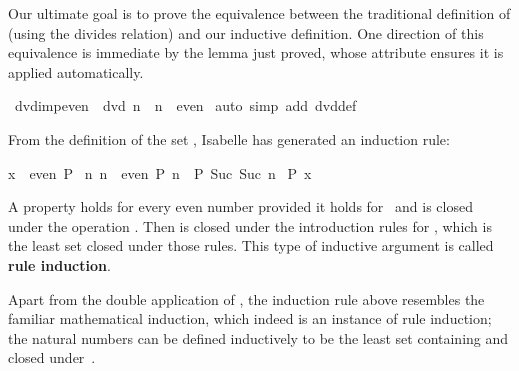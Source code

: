 \begin{isabellebody}
\begin{isamarkuptxt}
Our ultimate goal is to prove the equivalence between the traditional
definition of  (using the divides relation) and our inductive
definition.  One direction of this equivalence is immediate by the lemma
just proved, whose  attribute ensures it is applied automatically.%
\end{isamarkuptxt}%
\isamarkuptrue%
%
\endisatagproof
{\isafoldproof}%
%
\isadelimproof
%
\endisadelimproof
{}\isamarkupfalse%
\ dvd{\isacharunderscore}imp{\isacharunderscore}even{\isacharcolon}\ {\isachardoublequoteopen}{}\ dvd\ n\ {\isasymLongrightarrow}\ n\ {\isasymin}\ even{\isachardoublequoteclose}\isanewline
%
\isadelimproof
%
\endisadelimproof
%
\isatagproof
{}\isamarkupfalse%
\ {\isacharparenleft}auto\ simp\ add{\isacharcolon}\ dvd{\isacharunderscore}def{\isacharparenright}%
\endisatagproof
{\isafoldproof}%
%
\isadelimproof
%
\endisadelimproof
%
\isamarkuptrue%
%
\begin{isamarkuptext}%
%
From the definition of the set
, Isabelle has
generated an induction rule:
\begin{isabelle}%
{\isasymlbrakk}x\ {\isasymin}\ even{\isacharsemicolon}\ P\ {}{\isacharsemicolon}\isanewline
\isaindent{\ }{\isasymAnd}n{\isachardot}\ {\isasymlbrakk}n\ {\isasymin}\ even{\isacharsemicolon}\ P\ n{\isasymrbrakk}\ {\isasymLongrightarrow}\ P\ {\isacharparenleft}Suc\ {\isacharparenleft}Suc\ n{\isacharparenright}{\isacharparenright}{\isasymrbrakk}\isanewline
{\isasymLongrightarrow}\ P\ x%
\end{isabelle}
A property  holds for every even number provided it
holds for~ and is closed under the operation
.  Then  is closed under the introduction
rules for , which is the least set closed under those rules. 
This type of inductive argument is called \textbf{rule induction}. 

Apart from the double application of , the induction rule above
resembles the familiar mathematical induction, which indeed is an instance
of rule induction; the natural numbers can be defined inductively to be
the least set containing  and closed under~.


\end{isamarkuptext}
\end{isabellebody}
